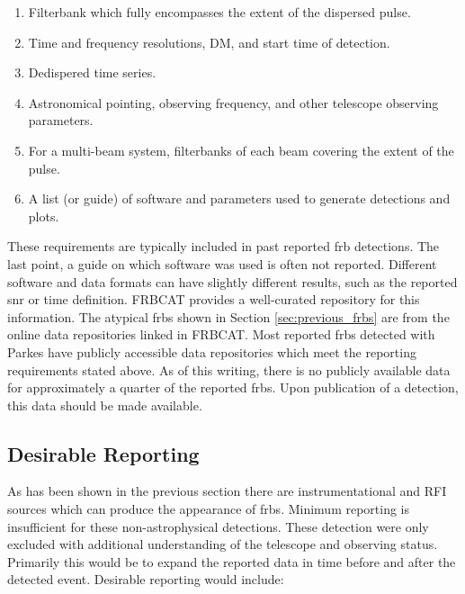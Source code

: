 \documentclass[a4paper,fleqn,usenatbib]{mnras}
\begin{document}
\begin{enumerate}
    \item Filterbank which fully encompasses the extent of the dispersed pulse.
    \item Time and frequency resolutions, DM, and start time of detection.
    \item Dedispered time series.
    \item Astronomical pointing, observing frequency, and other telescope
    observing parameters.
    \item For a multi-beam system, filterbanks of each beam covering the extent
    of the pulse.
    \item A list (or guide) of software and parameters used to generate
    detections and plots.
\end{enumerate}

These requirements are typically included in past reported \gls{frb} detections.
The last point, a guide on which software was used is often not reported.
Different software and data formats can have slightly different results, such as
the reported \gls{snr} or time definition.  FRBCAT \citep{2016PASA...33...45P}
provides a well-curated repository for this information. The atypical
\glspl{frb} shown in Section \ref{sec:previous_frbs} are from the online data
repositories linked in FRBCAT. Most reported \glspl{frb} detected with Parkes
have publicly accessible data repositories which meet the reporting requirements
stated above. As of this writing, there is no publicly available data for
approximately a quarter of the reported \glspl{frb}. Upon publication of a
detection, this data should be made available.

\subsection{Desirable Reporting}

As has been shown in the previous section there are instrumentational and RFI
sources which can produce the appearance of \glspl{frb}. Minimum reporting is
insufficient for these non-astrophysical detections. These detection were only
excluded with additional understanding of the telescope and observing status.
Primarily this would be to expand the reported data in time before and after the
detected event. Desirable reporting would include:
\end{document}
